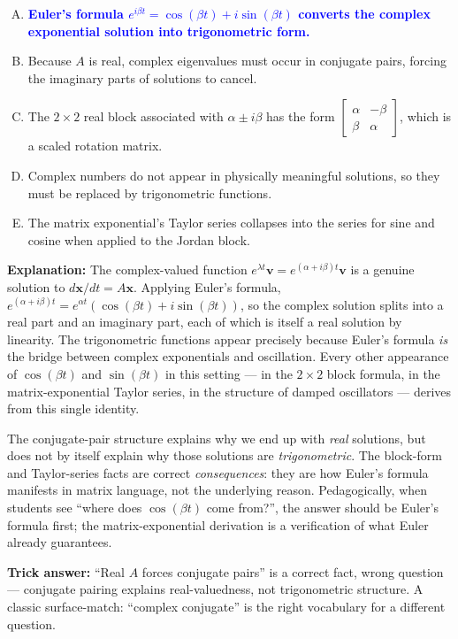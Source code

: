 \documentclass[12pt]{amsart}
\begin{document}
\begin{enumerate}[(A)]
\item \textcolor{blue}{\textbf{Euler's formula $e^{i\beta t} = \cos(\beta t) + i\sin(\beta t)$ converts the complex exponential solution into trigonometric form.}}
\item Because $A$ is real, complex eigenvalues must occur in conjugate pairs, forcing the imaginary parts of solutions to cancel.
\item The $2 \times 2$ real block associated with $\alpha \pm i\beta$ has the form $\begin{bmatrix} \alpha & -\beta \\ \beta & \alpha \end{bmatrix}$, which is a scaled rotation matrix.
\item Complex numbers do not appear in physically meaningful solutions, so they must be replaced by trigonometric functions.
\item The matrix exponential's Taylor series collapses into the series for sine and cosine when applied to the Jordan block.
\end{enumerate}

\textbf{Explanation:}
The complex-valued function $e^{\lambda t}\mathbf{v} = e^{(\alpha + i\beta)t}\mathbf{v}$
is a genuine solution to $d\mathbf{x}/dt = A\mathbf{x}$. Applying Euler's
formula, $e^{(\alpha + i\beta)t} = e^{\alpha t}(\cos(\beta t) + i\sin(\beta t))$,
so the complex solution splits into a real part and an imaginary part, each
of which is itself a real solution by linearity. The trigonometric
functions appear precisely because Euler's formula \emph{is} the bridge
between complex exponentials and oscillation. Every other appearance of
$\cos(\beta t)$ and $\sin(\beta t)$ in this setting --- in the $2 \times 2$
block formula, in the matrix-exponential Taylor series, in the structure
of damped oscillators --- derives from this single identity.

The conjugate-pair structure explains why we end up with \emph{real}
solutions, but does not by itself explain why those solutions are
\emph{trigonometric}. The block-form and Taylor-series facts are correct
\emph{consequences}: they are how Euler's formula manifests in matrix
language, not the underlying reason. Pedagogically, when students see
``where does $\cos(\beta t)$ come from?'', the answer should be Euler's
formula first; the matrix-exponential derivation is a verification of what
Euler already guarantees.

\textbf{Trick answer:}
``Real $A$ forces conjugate pairs'' is a correct fact, wrong question ---
conjugate pairing explains real-valuedness, not trigonometric structure.
A classic surface-match: ``complex conjugate'' is the right vocabulary for
a different question.
\end{document}
